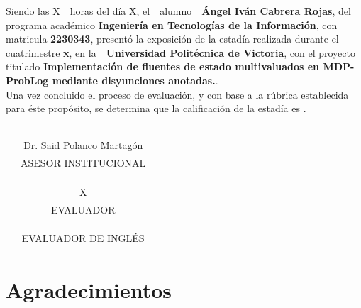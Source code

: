 \documentclass[12pt]{article}
\newcommand{\ncarrera}            {Ingeniería en Tecnologías de la Información}
\newcommand{\nasesorinstitucional}{Dr. Said Polanco Martagón}
\newcommand{\NombreAlumno}{Ángel Iván Cabrera Rojas}
\newcommand{\elolaNombreAlumno}{el}
\newcommand{\OA}           {o}  %
\newcommand{\Matricula}           {2230343}  %
\newcommand{\NombreProyecto}{Implementación de fluentes de estado multivaluados en MDP-ProbLog mediante disyunciones anotadas.}
\newcommand{\ncuatrimestre}{x}
\newcommand{\nevalador}{X}
\newcommand{\FechaExposicion}{X}
\newcommand{\HoraExposionFormatoVenticuatroHoras}{X}
\newcommand{\elolaNombreEmpresa}{la}  %
\newcommand{\organismoreceptor}   {Universidad Politécnica de Victoria}
\begin{document}
Siendo las \HoraExposionFormatoVenticuatroHoras \ \ horas del día \FechaExposicion, \elolaNombreAlumno\ \ alumn\OA\ \ \textbf{\NombreAlumno}, del programa académico \textbf{\ncarrera}, con matricula \textbf{\Matricula}, presentó la exposición de la estadía realizada durante el cuatrimestre \textbf{\ncuatrimestre}, en \elolaNombreEmpresa\ \ \textbf{\organismoreceptor}, con el proyecto titulado \textbf{\NombreProyecto}.\\

Una vez concluido el proceso de evaluación, y con base a la rúbrica establecida para éste propósito, se determina que la calificación de la estadía es \underline{\hspace{2cm}}. %

\begin{center}
\begin{tabular}{ccc}
& & \\
& & \\
& & \\
\hline 
& \nasesorinstitucional & \\
& ASESOR INSTITUCIONAL & \\
& & \\
& & \\
& & \\
\hline 
& \nevalador & \\
& EVALUADOR & \\
& & \\
& & \\
\hline 
& & \\
& EVALUADOR DE INGLÉS & \\
\end{tabular}
\end{center}

\normalsize

\clearpage
\ClearWallPaper
\pagestyle{fancy}
\section*{\centering Agradecimientos}

\end{document}
